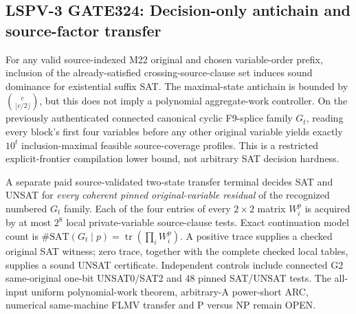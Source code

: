 \subsection*{LSPV-3 GATE324: Decision-only antichain and source-factor transfer}
For any valid source-indexed M22 original and chosen variable-order prefix,
inclusion of the already-satisfied crossing-source-clause set induces
sound dominance for existential suffix SAT. The maximal-state antichain is
bounded by \(\binom{c}{\lfloor c/2\rfloor}\), but this does not imply a
polynomial aggregate-work controller. On the previously authenticated
connected canonical cyclic F9-splice family \(G_t\), reading every block's
first four variables before any other original variable yields exactly
\(10^t\) inclusion-maximal feasible source-coverage profiles. This is a
restricted explicit-frontier compilation lower bound, not arbitrary SAT
decision hardness.

A separate paid source-validated two-state transfer terminal decides SAT
and UNSAT for \emph{every coherent pinned original-variable residual} of
the recognized numbered \(G_t\) family. Each of the four entries of every
\(2\times2\) matrix \(W_i^p\) is acquired by at most \(2^8\) local
private-variable source-clause tests. Exact continuation model count is
\(\#\mathrm{SAT}(G_t\mid p)=\operatorname{tr}(\prod_i W_i^p)\).
A positive trace supplies a checked original SAT witness; zero trace,
together with the complete checked local tables, supplies a sound UNSAT
certificate. Independent controls include connected G2 same-original
one-bit UNSAT0/SAT2 and 48 pinned SAT/UNSAT tests. The all-input uniform
polynomial-work theorem, arbitrary-A power-short ARC, numerical same-machine
FLMV transfer and P versus NP remain OPEN.
